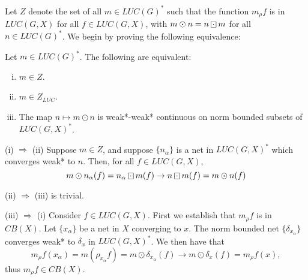 Let $Z$ denote the set of all $m\in LUC(G)^*$ such that the function $m_\rho f$ is in $LUC(G,X)$
for all $f\in LUC(G,X)$, with $m\odot n = n\dotbox m$ for all $n\in LUC(G)^*$.
We begin by proving the following equivalence:
\begin{lemma}\label{lau:arens}
Let $m \in LUC(G)^*$.  The following are equivalent:
\begin{enumerate}[(i)]
\item $m\in Z$.
\item $m\in Z_{LUC}$.
\item The map $n\mapsto m\odot n$ is weak*-weak* continuous on norm bounded subsets of $LUC(G,X)^*$.
\end{enumerate}\end{lemma}

\proof
(i) $\Rightarrow$ (ii) Suppose $m\in Z$, and suppose $\{n_\alpha\}$ is a net in $LUC(G,X)^*$
which converges weak* to $n$.  Then, for all $f \in LUC(G,X)$,
\[
m\odot n_\alpha (f) = n_\alpha \dotbox m(f) \rightarrow n\dotbox m(f) = m \odot n(f)
\]

(ii) $\Rightarrow$ (iii) is trivial.

(iii) $\Rightarrow$ (i) Consider $f \in LUC(G,X)$.  First we establish that $m_\rho f$ is in $CB(X)$.
Let $\{x_\alpha\}$ be a net in $X$
converging to $x$.  The norm bounded net $\{\delta_{x_\alpha}\}$ converges weak* to $\delta_x$ in $LUC(G,X)^*$.
We then have that
\[
m_\rho f(x_\alpha) = m(\rho_{x_{\alpha}}f) = m \odot \delta_{x_\alpha}(f)
\longrightarrow m \odot \delta_x (f) = m_\rho f(x),
\]
thus $m_\rho f \in CB(X)$.


